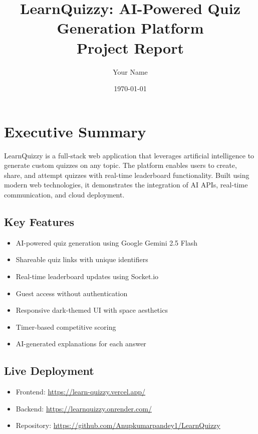 \documentclass[12pt,a4paper]{article}
\title{\textbf{LearnQuizzy: AI-Powered Quiz Generation Platform} \\ 
\large Project Report}
\author{Your Name}
\date{\today}
\begin{document}
\maketitle
\newpage

\tableofcontents
\newpage

\section{Executive Summary}

LearnQuizzy is a full-stack web application that leverages artificial intelligence to generate custom quizzes on any topic. The platform enables users to create, share, and attempt quizzes with real-time leaderboard functionality. Built using modern web technologies, it demonstrates the integration of AI APIs, real-time communication, and cloud deployment.

\subsection{Key Features}
\begin{itemize}
    \item AI-powered quiz generation using Google Gemini 2.5 Flash
    \item Shareable quiz links with unique identifiers
    \item Real-time leaderboard updates using Socket.io
    \item Guest access without authentication
    \item Responsive dark-themed UI with space aesthetics
    \item Timer-based competitive scoring
    \item AI-generated explanations for each answer
\end{itemize}

\subsection{Live Deployment}
\begin{itemize}
    \item Frontend: \url{https://learn-quizzy.vercel.app/}
    \item Backend: \url{https://learnquizzy.onrender.com/}
    \item Repository: \url{https://github.com/Anupkumarpandey1/LearnQuizzy}
\end{itemize}

\newpage
\end{document}
